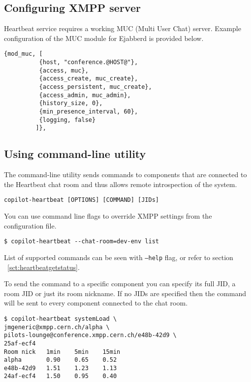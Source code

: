 \subsection{Configuring XMPP server}

\copilot Heartbeat service requires a working MUC (Multi User Chat) server. Example configuration of the MUC module for Ejabberd is provided below.

\lstset{caption=Example configuration of MUC module}
\begin{lstlisting}
{mod_muc, [
          {host, "conference.@HOST@"},
          {access, muc},
          {access_create, muc_create},
          {access_persistent, muc_create},
          {access_admin, muc_admin},
          {history_size, 0},
          {min_presence_interval, 60},
          {logging, false}
         ]},
\end{lstlisting}

\subsection{Using command-line utility}
\label{sct:heartbeatcmd}

The command-line utility sends commands to components that are connected to the Heartbeat chat room and thus allows remote introspection
of the system.

\lstset{caption=Arguments of copilot-heartbeat utility}
\begin{lstlisting}
copilot-heartbeat [OPTIONS] [COMMAND] [JIDs]
\end{lstlisting}

You can use command line flags to override XMPP settings from the configuration file.

\lstset{caption=Overriding name of the chat room}
\begin{lstlisting}
$ copilot-heartbeat --chat-room=dev-env list
\end{lstlisting}

List of supported commands can be seen with \texttt{--help} flag, or refer to section ~\ref{sct:heartbeatgetstatus}.

To send the command to a specific component you can specify its full JID, a room JID or just its room nickname. If no JIDs are specified then the command will be sent to every component connected to the chat room.

\lstset{caption=Requesting system load from several components}
\begin{lstlisting}
$ copilot-heartbeat systemLoad \
jmgeneric@xmpp.cern.ch/alpha \
pilots-lounge@conference.xmpp.cern.ch/e48b-42d9 \
25af-ecf4
Room nick   1min    5min    15min
alpha       0.90    0.65    0.52
e48b-42d9   1.51    1.23    1.13
24af-ecf4   1.50    0.95    0.40
\end{lstlisting}

